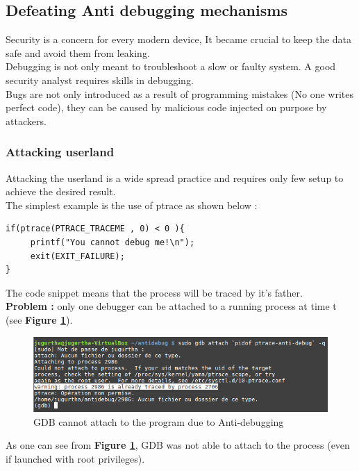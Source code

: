 \subsection{Defeating Anti debugging mechanisms}
Security is a concern for every modern device, It became crucial to keep the data safe and avoid them from leaking.\\
Debugging is not only meant to troubleshoot a slow or faulty system. A good security analyst requires skills in debugging.\\
Bugs are not only introduced as a result of programming mistakes (No one writes perfect code), they can be caused by malicious code injected on purpose by attackers.

\subsubsection{Attacking userland}
Attacking the userland is a wide spread practice and requires only few setup to achieve the desired result.\\

The simplest example is the use of ptrace as shown below :
	\begin{lstlisting}[style=CStyle]
if(ptrace(PTRACE_TRACEME , 0) < 0 ){
     printf("You cannot debug me!\n");
     exit(EXIT_FAILURE);
}
    	\end{lstlisting}
The code snippet means that the process will be traced by it's father. \\

\textbf{\color{red}Problem : } only one debugger can be attached to a running process at time t (see \textbf{Figure \ref{GDB cannot attach to the program due to Anti-debugging}}).
    		\begin{figure}[H]
					\centering
        			\includegraphics[scale=0.45]{img/solution/gdb-cannot-be-attached.png}
        			\caption{GDB cannot attach to the program due to Anti-debugging}
        			\label{GDB cannot attach to the program due to Anti-debugging}
   			 \end{figure}
   			 As one can see from \textbf{Figure \ref{GDB cannot attach to the program due to Anti-debugging}}, GDB was not able to attach to the process (even if launched with root privileges).
   			 
